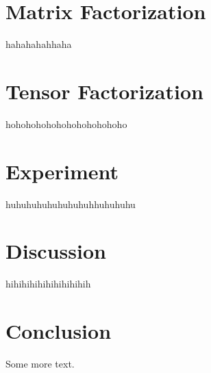 \documentclass[10pt]{sigplan-proc-varsize-sensys11}
\begin{document}
\section{Matrix Factorization}  \label{sec:mf}

hahahahahhaha

\section{Tensor Factorization}  \label{sec:tf}
hohohohohohohohohohohoho
\section{Experiment}  \label{sec:exp}
huhuhuhuhuhuhuhuhhuhuhuhu
\section{Discussion}  \label{sec:disc}
hihihihihihihihihihih
\section{Conclusion}  \label{sec:conc}

Some more text.


{\footnotesize


}
\end{document}
